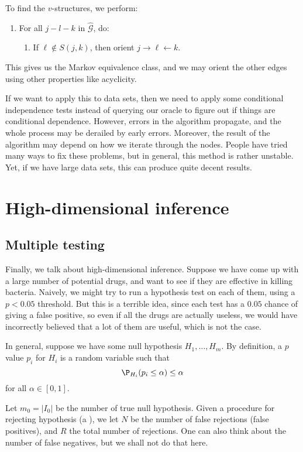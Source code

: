 \documentclass[a4paper]{article}
\begin{document}
To find the $v$-structures, we perform:
\begin{enumerate}
  \item For all $j-l-k$ in $\hat{\mathcal{G}}$, do:
    \begin{enumerate}
      \item If $\ell \not \in S(j, k)$, then orient $j \to \ell \leftarrow k$.
    \end{enumerate}
\end{enumerate}
This gives us the Markov equivalence class, and we may orient the other edges using other properties like acyclicity.

If we want to apply this to data sets, then we need to apply some conditional independence tests instead of querying our oracle to figure out if things are conditional dependence. However, errors in the algorithm propagate, and the whole process may be derailed by early errors. Moreover, the result of the algorithm may depend on how we iterate through the nodes. People have tried many ways to fix these problems, but in general, this method is rather unstable. Yet, if we have large data sets, this can produce quite decent results.

\section{High-dimensional inference}
\subsection{Multiple testing}
Finally, we talk about high-dimensional inference. Suppose we have come up with a large number of potential drugs, and want to see if they are effective in killing bacteria. Naively, we might try to run a hypothesis test on each of them, using a $p < 0.05$ threshold. But this is a terrible idea, since each test has a $0.05$ chance of giving a false positive, so even if all the drugs are actually useless, we would have incorrectly believed that a lot of them are useful, which is not the case.

In general, suppose we have some null hypothesis $H_1, \ldots, H_m$. By definition, a $p$ value $p_i$ for $H_i$ is a random variable such that
\[
  \P_{H_i}(p_i \leq \alpha) \leq \alpha
\]
for all $\alpha \in [0, 1]$.

Let $m_0 = |I_0|$ be the number of true null hypothesis. Given a procedure for rejecting hypothesis (a ), we let $N$ be the number of false rejections (false positives), and $R$ the total number of rejections. One can also think about the number of false negatives, but we shall not do that here.
\end{document}
